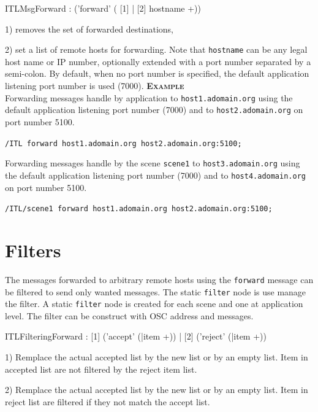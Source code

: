 \documentclass[a4paper,twoside]{report}
\newcommand{\sublevel}[1]	{\section{#1}}
\newcommand{\OSC}[1]		{\texttt{#1}}
\newcommand{\example}		{\textbf{\hspace{-1.5cm}\textbf{\textsc{Example }}}}
\let\olditemize\itemize
\let\oldenditemize\enditemize
\renewenvironment{itemize} 	{\olditemize \setlength{\itemsep}{1mm}}{\oldenditemize}
\newcommand{\sample}	[1]			{\vspace{-2mm}\begin{center}\colorbox{mygrey}{
								\begin{minipage}[t]{0.9\columnwidth} 
								{\small \texttt{#1}}
								\end{minipage}}\end{center}}
\begin{document}
\begin{rail}
ITLMsgForward : ('forward' ( [1] | [2] hostname +))
\end{rail}

\begin{itemize}

\item 1) removes the set of forwarded destinations,
\item 2) set a list of remote hosts for forwarding. Note that \OSC{hostname} can be any legal host name or IP number, optionally extended with a port number separated by a semi-colon. By default, when no port number is specified, the default application listening port number is used (7000).
\end{itemize}
\example\\
Forwarding messages handle by application to \OSC{host1.adomain.org} using the default application listening port number (7000)
and to \OSC{host2.adomain.org} on port number 5100.

\sample{/ITL forward host1.adomain.org host2.adomain.org:5100;}


Forwarding messages handle by the scene \OSC{scene1} to \OSC{host3.adomain.org} using the default application listening port number (7000)
and to \OSC{host4.adomain.org} on port number 5100.

\sample{/ITL/scene1 forward host1.adomain.org host2.adomain.org:5100;}

\sublevel{Filters}
\label{ITLFilteringForward}

The messages forwarded to arbitrary remote hosts using the \OSC{forward} message can be filtered to send only wanted messages. The static \OSC{filter} node is use manage the filter. A static \OSC{filter} node is created for each scene and one at application level. The filter can be construct with OSC address and messages. 
 
\begin{rail}
ITLFilteringForward : [1] ('accept' (|item +)) | [2] ('reject' (|item +))
\end{rail}

\begin{itemize}
\item 1) Remplace the actual accepted list by the new list or by an empty list. Item in accepted list are not filtered by the reject item list.
\item 2) Remplace the actual accepted list by the new list or by an empty list. Item in reject list are filtered if they not match the accept list.
\end{itemize}
\end{document}
